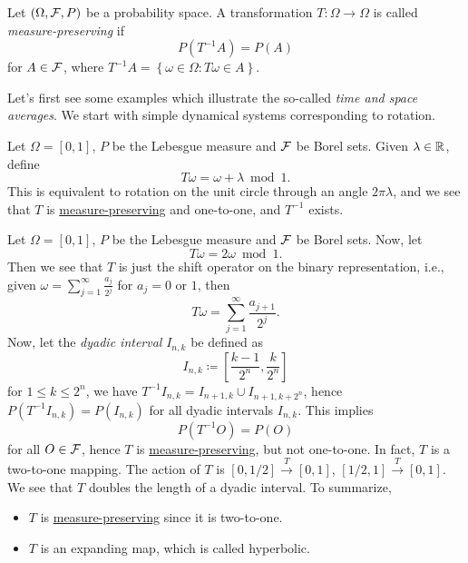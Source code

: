 \begin{definition}\label{def:measure-preserving}
	Let \((\Omega , \mathcal{\MakeUppercase{f}} , P)\) be a probability space. A transformation \(T\colon \Omega \to \Omega \) is called \emph{measure-preserving} if
	\[
		P(T^{-1} A) = P(A)
	\]
	for \(A\in \mathcal{\MakeUppercase{f}} \), where \(T^{-1} A = \left\{ \omega \in \Omega \colon T \omega \in A \right\} \).
\end{definition}

Let's first see some examples which illustrate the so-called \emph{time and space averages}. We start with simple dynamical systems corresponding to rotation.

\begin{eg}[Rotation]
	Let \(\Omega =[0, 1]\), \(P\) be the Lebesgue measure and \(\mathcal{\MakeUppercase{f}} \) be Borel sets. Given \(\lambda \in \mathbb{\MakeUppercase{r}} \), define
	\[
		T \omega = \omega + \lambda \bmod 1.
	\]
	This is equivalent to rotation on the unit circle through an angle \(2\pi \lambda \), and we see that \(T\) is \hyperref[def:measure-preserving]{measure-preserving} and one-to-one, and \(T^{-1} \) exists.
\end{eg}

\begin{eg}\label{eg:shift-op}
	Let \(\Omega =[0, 1]\), \(P\) be the Lebesgue measure and \(\mathcal{\MakeUppercase{f}} \) be Borel sets. Now, let
	\[
		T \omega = 2 \omega \bmod 1.
	\]
	Then we see that \(T\) is just the shift operator on the binary representation, i.e., given \(\omega = \sum_{j=1} ^{\infty} \frac{a_{j} }{2^j}\) for \(a_j = 0\) or \(1\), then
	\[
		T \omega = \sum\limits_{j=1}^{\infty } \frac{a_{j+1}}{2^j}.
	\]
	Now, let the \emph{dyadic interval} \(I_{n, k}\) be defined as
	\[
		I_{n, k}\coloneqq \left[ \frac{k-1}{2^n}, \frac{k}{2^n} \right]
	\]
	for \(1 \leq k \leq 2^n\), we have \(T^{-1} I_{n, k} = I_{n+1, k} \cup I_{n+1, k+ 2^n}\), hence \(P(T^{-1} I_{n, k}) = P(I_{n, k})\) for all dyadic intervals \(I_{n, k}\). This implies
	\[
		P(T^{-1} O) = P(O)
	\]
	for all \(O\in \mathcal{\MakeUppercase{f}} \), hence \(T\) is \hyperref[def:measure-preserving]{measure-preserving}, but not one-to-one. In fact, \(T\) is a two-to-one mapping. The action of \(T\) is \([0, 1 / 2] \overset{T}{\to} [0, 1]\), \([1 / 2, 1] \overset{T}{\to} [0, 1]\). We see that \(T\) doubles the length of a dyadic interval. To summarize,
	\begin{itemize}
		\item \(T\) is \hyperref[def:measure-preserving]{measure-preserving} since it is two-to-one.
		\item \(T\) is an expanding map, which is called hyperbolic.
	\end{itemize}
\end{eg}